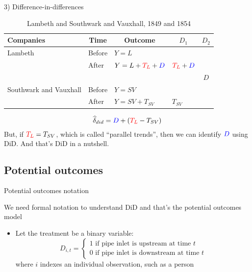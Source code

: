 \documentclass{beamer}
\begin{document}
\begin{frame}{3) Difference-in-differences}

\begin{table}\centering
		\caption{Lambeth and Southwark and Vauxhall, 1849 and 1854}
		\begin{center}
		\begin{tabular}{lll|lc}
		\toprule
		\multicolumn{1}{l}{\textbf{Companies}}&
		\multicolumn{1}{c}{\textbf{Time}}&
		\multicolumn{1}{c}{\textbf{Outcome}}&
		\multicolumn{1}{c}{$D_1$}&
		\multicolumn{1}{c}{$D_2$}\\
		\midrule
		Lambeth & Before & $Y=L$ \\
		& After & $Y=L + \textcolor{red}{T_L} + \textcolor{blue}{D}$ & $\textcolor{red}{T_L}+\textcolor{blue}{D}$\\
		\midrule
		& & & & $D$ \\
		\midrule
		Southwark and Vauxhall & Before & $Y=SV$ \\
		& After & $Y=SV + T_{SV}$ & $T_{SV}$\\
		\bottomrule
		\end{tabular}
		\end{center}
	\end{table}

\begin{eqnarray*}
\widehat{\delta}_{did} = \textcolor{blue}{D} + (\textcolor{red}{T_L} - T_{SV})
\end{eqnarray*}But, if $\textcolor{red}{T_L}=\textcolor{black}{T_{SV}}$, which is called ``parallel trends'', then we can identify $\textcolor{blue}{D}$ using DiD.  And that's DiD in a nutshell. 

\end{frame}



\subsection{Potential outcomes}



\begin{frame}{Potential outcomes notation}

We need formal notation to understand DiD and that's the potential outcomes model

\bigskip
	
	\begin{itemize}
	\item Let the treatment be a binary variable: $$D_{i,t} =\begin{cases} 1 \text{ if pipe inlet is upstream at time $t$} \\ 0 \text{ if pipe inlet is downstream at time $t$} \end{cases}$$where $i$ indexes an individual observation, such as a person

	\end{itemize}
\end{frame}
\end{document}
